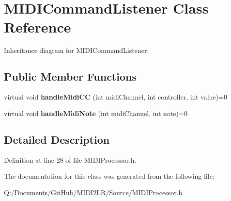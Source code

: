 \hypertarget{class_m_i_d_i_command_listener}{}\section{M\+I\+D\+I\+Command\+Listener Class Reference}
\label{class_m_i_d_i_command_listener}


Inheritance diagram for M\+I\+D\+I\+Command\+Listener\+:
\subsection*{Public Member Functions}
\begin{DoxyCompactItemize}
\item 
virtual void {\bfseries handle\+Midi\+CC} (int midi\+Channel, int controller, int value)=0\hypertarget{class_m_i_d_i_command_listener_aad409d33d03ab49939b381d62db36e94}{}\label{class_m_i_d_i_command_listener_aad409d33d03ab49939b381d62db36e94}

\item 
virtual void {\bfseries handle\+Midi\+Note} (int midi\+Channel, int note)=0\hypertarget{class_m_i_d_i_command_listener_a21e88217460746b8c568ab563ada630d}{}\label{class_m_i_d_i_command_listener_a21e88217460746b8c568ab563ada630d}

\end{DoxyCompactItemize}


\subsection{Detailed Description}


Definition at line 28 of file M\+I\+D\+I\+Processor.\+h.



The documentation for this class was generated from the following file\+:\begin{DoxyCompactItemize}
\item 
Q\+:/\+Documents/\+Git\+Hub/\+M\+I\+D\+I2\+L\+R/\+Source/M\+I\+D\+I\+Processor.\+h\end{DoxyCompactItemize}
